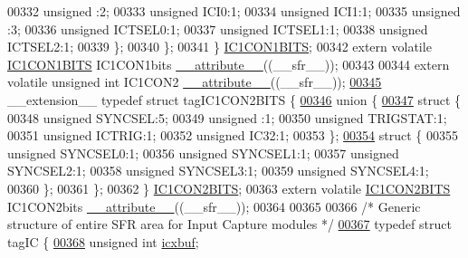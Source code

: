 \begin{DoxyCode}
00332       \textcolor{keywordtype}{unsigned} :2;
00333       \textcolor{keywordtype}{unsigned} ICI0:1;
00334       \textcolor{keywordtype}{unsigned} ICI1:1;
00335       \textcolor{keywordtype}{unsigned} :3;
00336       \textcolor{keywordtype}{unsigned} ICTSEL0:1;
00337       \textcolor{keywordtype}{unsigned} ICTSEL1:1;
00338       \textcolor{keywordtype}{unsigned} ICTSEL2:1;
00339     \};
00340   \};
00341 \} \hyperlink{a00008_dd/d63/a00455}{IC1CON1BITS};
00342 \textcolor{keyword}{extern} \textcolor{keyword}{volatile} \hyperlink{a00008_dd/d63/a00455}{IC1CON1BITS} IC1CON1bits \hyperlink{a00009_a493c46f03454991ccc5aa7a6e1dfb2a7}{\_\_attribute\_\_}((\_\_sfr\_\_));
00343 
00344 \textcolor{keyword}{extern} \textcolor{keyword}{volatile} \textcolor{keywordtype}{unsigned} \textcolor{keywordtype}{int}  IC1CON2 \hyperlink{a00009_a493c46f03454991ccc5aa7a6e1dfb2a7}{\_\_attribute\_\_}((\_\_sfr\_\_));
\hypertarget{a00009_source_l00345}{}\hyperlink{a00008}{00345} \_\_extension\_\_ \textcolor{keyword}{typedef} \textcolor{keyword}{struct }tagIC1CON2BITS \{
\hypertarget{a00009_source_l00346}{}\hyperlink{a00009}{00346}   \textcolor{keyword}{union }\{
\hypertarget{a00009_source_l00347}{}\hyperlink{a00009}{00347}     \textcolor{keyword}{struct }\{
00348       \textcolor{keywordtype}{unsigned} SYNCSEL:5;
00349       \textcolor{keywordtype}{unsigned} :1;
00350       \textcolor{keywordtype}{unsigned} TRIGSTAT:1;
00351       \textcolor{keywordtype}{unsigned} ICTRIG:1;
00352       \textcolor{keywordtype}{unsigned} IC32:1;
00353     \};
\hypertarget{a00009_source_l00354}{}\hyperlink{a00009}{00354}     \textcolor{keyword}{struct }\{
00355       \textcolor{keywordtype}{unsigned} SYNCSEL0:1;
00356       \textcolor{keywordtype}{unsigned} SYNCSEL1:1;
00357       \textcolor{keywordtype}{unsigned} SYNCSEL2:1;
00358       \textcolor{keywordtype}{unsigned} SYNCSEL3:1;
00359       \textcolor{keywordtype}{unsigned} SYNCSEL4:1;
00360     \};
00361   \};
00362 \} \hyperlink{a00008_da/d65/a00458}{IC1CON2BITS};
00363 \textcolor{keyword}{extern} \textcolor{keyword}{volatile} \hyperlink{a00008_da/d65/a00458}{IC1CON2BITS} IC1CON2bits \hyperlink{a00009_a493c46f03454991ccc5aa7a6e1dfb2a7}{\_\_attribute\_\_}((\_\_sfr\_\_));
00364 
00365 
00366 \textcolor{comment}{/* Generic structure of entire SFR area for Input Capture modules */}
\hypertarget{a00009_source_l00367}{}\hyperlink{a00008}{00367} \textcolor{keyword}{typedef} \textcolor{keyword}{struct }tagIC \{
\hypertarget{a00009_source_l00368}{}\hyperlink{a00008_ae557d410aa679e2ba67204aeb7566392}{00368}         \textcolor{keywordtype}{unsigned} \textcolor{keywordtype}{int} \hyperlink{a00008_ae557d410aa679e2ba67204aeb7566392}{icxbuf};

\end{DoxyCode}
